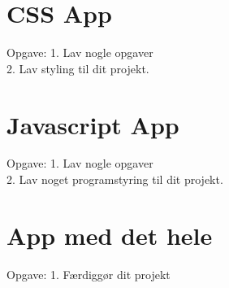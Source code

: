 \documentclass[10pt]{beamer}
\begin{document}
\section{CSS App}
\begin{frame}{Opgave:}
	1. Lav nogle opgaver \\
	2. Lav styling til dit projekt.
\end{frame}

\section{Javascript App}
\begin{frame}{Opgave:}
	1. Lav nogle opgaver \\
	2. Lav noget programstyring til dit projekt.
\end{frame}

\section{App med det hele}
\begin{frame}{Opgave:}
	1. Færdiggør dit projekt
\end{frame}


 
\end{document}

